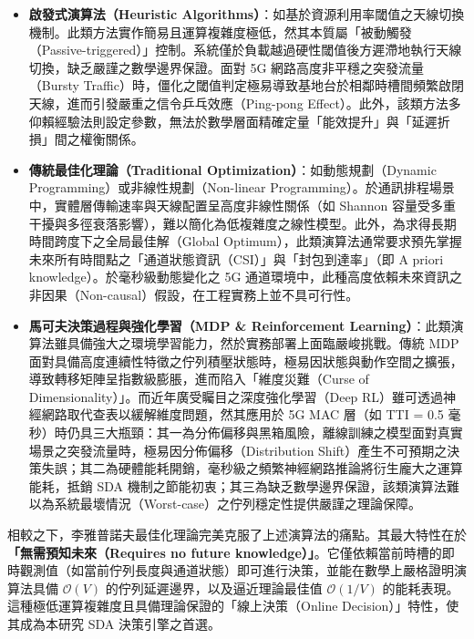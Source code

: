 \begin{itemize}
    \item \textbf{啟發式演算法（Heuristic Algorithms）}：如基於資源利用率閾值之天線切換機制。此類方法實作簡易且運算複雜度極低，然其本質屬「被動觸發（Passive-triggered）」控制。系統僅於負載越過硬性閾值後方遲滯地執行天線切換，缺乏嚴謹之數學邊界保證。面對 5G 網路高度非平穩之突發流量（Bursty Traffic）時，僵化之閾值判定極易導致基地台於相鄰時槽間頻繁啟閉天線，進而引發嚴重之信令乒乓效應（Ping-pong Effect）。此外，該類方法多仰賴經驗法則設定參數，無法於數學層面精確定量「能效提升」與「延遲折損」間之權衡關係。
    
    \item \textbf{傳統最佳化理論（Traditional Optimization）}：如動態規劃（Dynamic Programming）或非線性規劃（Non-linear Programming）。於通訊排程場景中，實體層傳輸速率與天線配置呈高度非線性關係（如 Shannon 容量受多重干擾與多徑衰落影響），難以簡化為低複雜度之線性模型。此外，為求得長期時間跨度下之全局最佳解（Global Optimum），此類演算法通常要求預先掌握未來所有時間點之「通道狀態資訊（CSI）」與「封包到達率」（即 A priori knowledge）。於毫秒級動態變化之 5G 通道環境中，此種高度依賴未來資訊之非因果（Non-causal）假設，在工程實務上並不具可行性。
    
    \item \textbf{馬可夫決策過程與強化學習（MDP \& Reinforcement Learning）}：此類演算法雖具備強大之環境學習能力，然於實務部署上面臨嚴峻挑戰。傳統 MDP 面對具備高度連續性特徵之佇列積壓狀態時，極易因狀態與動作空間之擴張，導致轉移矩陣呈指數級膨脹，進而陷入「維度災難（Curse of Dimensionality）」。而近年廣受矚目之深度強化學習（Deep RL）雖可透過神經網路取代查表以緩解維度問題，然其應用於 5G MAC 層（如 TTI = 0.5 毫秒）時仍具三大瓶頸：其一為分佈偏移與黑箱風險，離線訓練之模型面對真實場景之突發流量時，極易因分佈偏移（Distribution Shift）產生不可預期之決策失誤；其二為硬體能耗開銷，毫秒級之頻繁神經網路推論將衍生龐大之運算能耗，抵銷 SDA 機制之節能初衷；其三為缺乏數學邊界保證，該類演算法難以為系統最壞情況（Worst-case）之佇列穩定性提供嚴謹之理論保障。
\end{itemize}

相較之下，李雅普諾夫最佳化理論完美克服了上述演算法的痛點。其最大特性在於\textbf{「無需預知未來（Requires no future knowledge）」}。它僅依賴當前時槽的即時觀測值（如當前佇列長度與通道狀態）即可進行決策，並能在數學上嚴格證明演算法具備 $\mathcal{O}(V)$ 的佇列延遲邊界，以及逼近理論最佳值 $\mathcal{O}(1/V)$ 的能耗表現。這種極低運算複雜度且具備理論保證的「線上決策（Online Decision）」特性，使其成為本研究 SDA 決策引擎之首選。

